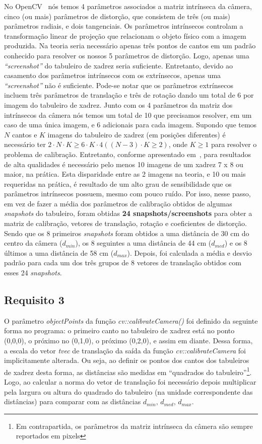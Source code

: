 \documentclass{bmvc2k}
\begin{document}
No OpenCV~\cite{opencvmanual} nós temos 4 parâmetros associados a matriz intrínseca da câmera, cinco (ou mais) parâmetros de distorção, que consistem de três (ou mais) parâmetros radiais, e dois tangenciais. Os parâmetros intrínsecos controlam a transformação linear de projeção que relacionam o objeto físico com a imagem produzida. Na teoria seria necessário apenas três pontos de cantos em um padrão conhecido para resolver os nossos 5 parâmetros de distorção. Logo, apenas uma \textit{``screenshot''} do tabuleiro de xadrez seria suficiente. Entretanto, devido ao casamento dos parâmetros intrínsecos com os extrínsecos, apenas uma \textit{``screenshot''} não é suficiente. Pode-se notar que os parâmetros extrínsecos incluem três parâmetros de translação e três de rotação dando um total de 6 por imagem do tabuleiro de xadrez. Junto com os 4 parâmetros da matriz dos intrínsecos da câmera nós temos um total de 10 que precisamos resolver, em um caso de uma única imagem, e 6 adicionais para cada imagem. Supondo que temos $N$ cantos e $K$ imagens do tabuleiro de xadrez (em posições diferentes) é necessário ter $2 \cdot N \cdot K \geq 6 \cdot K \cdot 4 ((N - 3)\cdot K \geq 2)$, onde $K \ge 1$ para resolver o problema de calibração. Entretanto, conforme apresentado em~\cite{kaehler2016learning}, para resultados de alta qualidades é necessário pelo menos 10 imagens de um xadrez 7 x 8 ou maior, na prática. Esta disparidade entre as 2 imagens na teoria, e 10 ou mais requeridas na prática, é resultado de um alto grau de sensibilidade que os parâmetros intrínsecos possuem, mesmo com pouco ruído. Por isso, nesse passo, em vez de fazer a média dos parâmetros de calibração obtidos de algumas \textit{snapshots} do tabuleiro, foram obtidas \textbf{24 snapshots/screenshots} para obter a matriz de calibração, vetores de translação, rotação e coeficientes de distorção. Sendo que os 8 primeiros \textit{snapshots} foram obtidos a uma distância de 30 cm do centro da câmera ($d_{min}$), os 8 seguintes a uma distância de 44 cm ($d_{med}$) e os 8 últimos a uma distância de 58 cm ($d_{max}$). Depois, foi calculada a média e desvio padrão para cada um dos três grupos de 8 vetores de translação obtidos com esses 24 \textit{snapshots}.

\subsection{Requisito 3}
O parâmetro \textit{objectPoints} da função \textit{cv::calibrateCamera()} foi definido da seguinte forma no programa: o primeiro canto no tabuleiro de xadrez está no ponto (0,0,0), o próximo no (0,1,0), o próximo (0,2,0), e assim em diante. Dessa forma, a escala do vetor \textit{tvec} de translação da saída da função \textit{cv::calibrateCamera} foi implicitamente alterada. Ou seja, ao definir os pontos dos cantos dos tabuleiros de xadrez desta forma, as distâncias são medidas em ``quadrados do tabuleiro''\footnote {Em contrapartida, os parâmetros da matriz intrínseca da câmera são sempre reportados em pixels}. Logo, ao calcular a norma do vetor de translação foi necessário depois multiplicar pela largura ou altura do quadrado do tabuleiro (na unidade correspondente das distâncias) para comparar com as distâncias $d_{min},\,d_{med},\,d_{max}$. 
\end{document}
